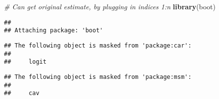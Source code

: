 \documentclass[
]{article}
\newenvironment{Shaded}{\begin{snugshade}}{\end{snugshade}}
\newcommand{\CommentTok}[1]{\textcolor[rgb]{0.56,0.35,0.01}{\textit{#1}}}
\newcommand{\KeywordTok}[1]{\textcolor[rgb]{0.13,0.29,0.53}{\textbf{#1}}}
\newcommand{\NormalTok}[1]{#1}
\begin{document}
\begin{Shaded}
\begin{Highlighting}[]
\CommentTok{# Can get original estimate, by plugging in indices 1:n}
\KeywordTok{library}\NormalTok{(boot)}
\end{Highlighting}
\end{Shaded}

\begin{verbatim}
## 
## Attaching package: 'boot'
\end{verbatim}

\begin{verbatim}
## The following object is masked from 'package:car':
## 
##     logit
\end{verbatim}

\begin{verbatim}
## The following object is masked from 'package:msm':
## 
##     cav
\end{verbatim}
\end{document}
